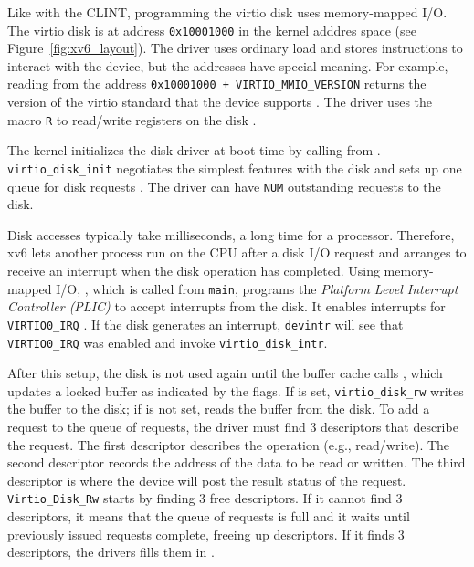 Like with the CLINT, programming the virtio disk uses memory-mapped
I/O.  The virtio disk is at address \lstinline{0x10001000} in the
kernel adddres space (see Figure~\ref{fig:xv6_layout}).  The driver
uses ordinary load and stores instructions to interact with the
device, but the addresses have special meaning.  For example, reading
from the address \lstinline{0x10001000 + VIRTIO_MMIO_VERSION}
 returns the version of the virtio
standard that the device supports
.  The driver uses the
macro \lstinline{R} to read/write registers on the disk
.

The kernel initializes the disk driver at boot time by calling
 from
 .
\lstinline{virtio_disk_init} negotiates the simplest features with the
disk  and sets
up one queue for disk requests .  The driver can have
\lstinline{NUM} outstanding requests to the disk.

Disk accesses typically take milliseconds, a long time for a
processor.  Therefore, xv6 lets another process run on the CPU after a
disk I/O request and arranges to receive an interrupt when the disk
operation has completed.  Using memory-mapped I/O,
, which is called from \lstinline{main}, programs
the \textit{Platform Level Interrupt Controller (PLIC)} to
accept interrupts from the disk.  It enables interrupts for
\lstinline{VIRTIO0_IRQ} .  If the
disk generates an interrupt, \lstinline{devintr}
 will see that
\lstinline{VIRTIO0_IRQ} was enabled and invoke
\lstinline{virtio_disk_intr}.

After this setup, the disk is not used again until the buffer cache calls
,
which updates a locked buffer
as indicated by the flags.
If
is set,
\lstinline{virtio_disk_rw}
writes the buffer
to the disk; if
is not set,
reads the buffer from the disk.
To add a request to the queue of requests, the driver must find 3
descriptors that describe the request.  The first descriptor
describes the operation (e.g., read/write).  The second descriptor
records the address of the data to be read or written. The third
descriptor is where the device will post the result status of the
request.  \lstinline{Virtio_Disk_Rw} starts by finding 3 free descriptors.  If
it cannot find 3 descriptors, it means that the queue of requests is
full and it waits until previously issued requests complete, freeing
up descriptors.   If it finds 3 descriptors, the drivers fills them
in .

